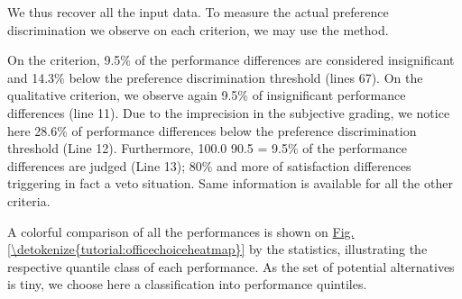\documentclass[a4paper,12pt,english]{sphinxhowto}
\begin{document}
We thus recover all the input data. To measure the actual preference discrimination we observe on each criterion, we may use the  method.

\begin{sphinxVerbatim}[commandchars=\\\{\},numbers=left,firstnumber=1,stepnumber=1]
\end{sphinxVerbatim}

On the  criterion, 9.5\% of the performance differences are considered insignificant and 14.3\% below the preference discrimination threshold (lines 6\sphinxhyphen{}7). On the qualitative  criterion, we observe again 9.5\% of insignificant performance differences (line 11). Due to the imprecision in the subjective grading, we notice here 28.6\% of performance differences below the preference discrimination threshold (Line 12). Furthermore, 100.0 \sphinxhyphen{} 90.5 = 9.5\% of the performance differences are judged  (Line 13); 80\% and more of satisfaction differences triggering in fact a veto situation. Same information is available for all the other criteria.

A colorful comparison of all the performances is shown on \hyperref[\detokenize{tutorial:officechoiceheatmap}]{Fig.\@ \ref{\detokenize{tutorial:officechoiceheatmap}}} by the  statistics, illustrating the respective quantile class of each performance. As the set of potential alternatives is tiny, we choose here a classification into performance quintiles.
\end{document}
